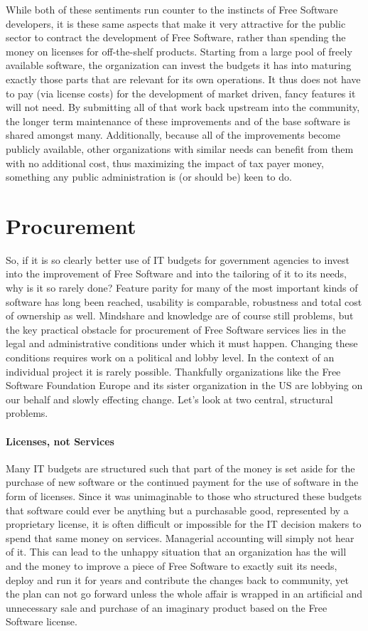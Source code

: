 While both of these sentiments run counter to the instincts of Free Software
developers, it is these same aspects that make it very attractive for the
public sector to contract the development of Free Software, rather than
spending the money on licenses for off-the-shelf products. Starting from a
large pool of freely available software, the organization can invest the
budgets it has into maturing exactly those parts that are relevant for its own
operations. It thus does not have to pay (via license costs) for the development of
market driven, fancy features it will not need. By submitting all of that work
back upstream into the community, the longer term maintenance of these
improvements and of the base software is shared amongst many. Additionally,
because all of the improvements become publicly available, other
organizations with similar needs can benefit from them with no
additional cost, thus maximizing the impact of tax payer money,
something any public administration is (or should be) keen to do.

\section*{Procurement}

So, if it is so clearly better use of IT budgets for government agencies to invest
into the improvement of Free Software and into the tailoring of it to its needs, why is it
so rarely done? Feature parity for many of the most important kinds of software has
long been reached, usability is comparable, robustness and total cost of ownership
as well. Mindshare and knowledge are of course still problems, but the key practical obstacle
for procurement of Free Software services lies in the legal and administrative
conditions under which it must happen. Changing these conditions requires work
on a political and lobby level. In the context of an individual project it is
rarely possible. Thankfully organizations like the Free Software Foundation Europe and
its sister organization in the US are lobbying on our behalf and slowly effecting
change. Let's look at two central, structural problems.

\paragraph*{Licenses, not Services}

Many IT budgets are structured such that part of the money is set aside
for the purchase of new software or the continued payment for the use of software
in the form of licenses. Since it was unimaginable to those who structured these
budgets that software could ever be anything but a purchasable good, represented
by a proprietary license, it is often difficult or impossible for the IT decision
makers to spend that same money on services. Managerial accounting will simply not hear of it.
This can lead to the unhappy situation that an organization has the will and the
money to improve a piece of Free Software to exactly suit its needs, deploy and run
it for years and contribute the changes back to community, yet the plan can not
go forward unless the whole affair is wrapped in an artificial and unnecessary sale
and purchase of an imaginary product based on the Free Software license.

